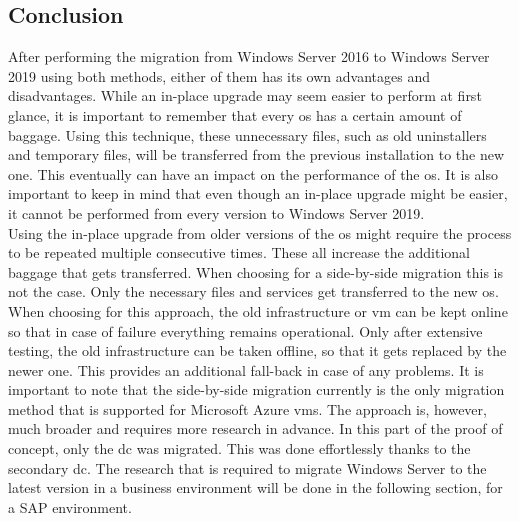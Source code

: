\subsection{Conclusion}
After performing the migration from Windows Server 2016 to Windows Server 2019 using both methods, either of them has its own advantages and disadvantages. 
While an in-place upgrade may seem easier to perform at first glance, it is important to remember that every \acrshort{os} has a certain amount of baggage.
Using this technique, these unnecessary files, such as old uninstallers and temporary files, will be transferred from the previous installation to the new one. 
This eventually can have an impact on the performance of the \acrshort{os}. 
It is also important to keep in mind that even though an in-place upgrade might be easier, it cannot be performed from every version to Windows Server 2019.
\\
Using the in-place upgrade from older versions of the \acrshort{os} might require the process to be repeated multiple consecutive times. 
These all increase the additional baggage that gets transferred. 
When choosing for a side-by-side migration this is not the case. 
Only the necessary files and services get transferred to the new \acrshort{os}. 
When choosing for this approach, the old infrastructure or \acrshort{vm} can be kept online so that in case of failure everything remains operational. 
Only after extensive testing, the old infrastructure can be taken offline, so that it gets replaced by the newer one. 
This provides an additional fall-back in case of any problems. 
It is important to note that the side-by-side migration currently is the only migration method that is supported for Microsoft Azure \acrshort{vm}s. 
The approach is, however, much broader and requires more research in advance. 
In this part of the proof of concept, only the \acrshort{dc} was migrated. 
This was done effortlessly thanks to the secondary \acrshort{dc}. 
The research that is required to migrate Windows Server to the latest version in a business environment will be done in the following section, for a SAP environment. 

